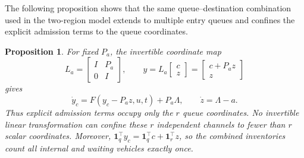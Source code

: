 \documentclass[journal,10pt]{IEEEtran}
\newtheorem{proposition}{Proposition}
\begin{document}
The following proposition shows that the same queue--destination combination
used in the two-region model extends to multiple entry queues and confines the
explicit admission terms to the queue coordinates.

\begin{proposition}
\label{prop:network-localization}
For fixed $P_a$, the invertible coordinate map
\begin{equation}
 L_a=\begin{bmatrix}I&P_a\\0&I\end{bmatrix},\qquad
 y=L_a\begin{bmatrix}c\\z\end{bmatrix}
   =\begin{bmatrix}c+P_a z\\z\end{bmatrix}
 \label{eq:network-transform}
\end{equation}
gives
\begin{equation}
 \dot y_c=F(y_c-P_a z,u,t)+P_a\Lambda,\qquad
 \dot z=\Lambda-a.
 \label{eq:network-transformed-flow}
\end{equation}
Thus explicit admission terms occupy only the $r$ queue coordinates. No
invertible linear transformation can confine these $r$ independent channels
to fewer than $r$ scalar coordinates. Moreover,
$\mathbf1_q^\top y_c=\mathbf1_q^\top c+\mathbf1_r^\top z$, so the combined
inventories count all internal and waiting vehicles exactly once.
\end{proposition}
\end{document}
